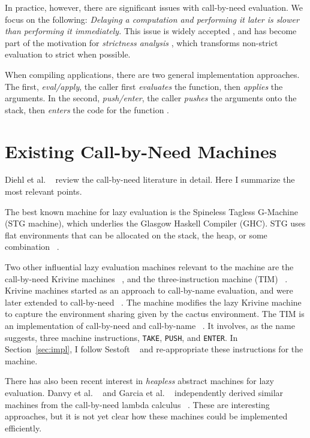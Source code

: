 In practice, however, there are significant issues with call-by-need evaluation.
We focus on the following: \emph{Delaying a computation and performing it later
is slower than performing it immediately.} This issue is widely accepted 
\cite{johnsson1984efficient,jonesstg}, and has become part of the motivation
for \emph{strictness analysis}
\cite{mycroft1982abstract,wadler1987projections}, which transforms non-strict
evaluation to strict when possible.

When compiling applications, there are two general implementation approaches.
The first, \emph{eval/apply}, the caller first \emph{evaluates} the function,
then \emph{applies} the arguments. In the second, \emph{push/enter}, the caller
\emph{pushes} the arguments onto the stack, then \emph{enters} the code for the
function \cite{marlow2006making}.  

\section{Existing Call-by-Need Machines}

Diehl et al. ~\cite{diehl2000abstract} review the call-by-need
literature in detail.  Here I summarize the most relevant points.

The best known machine for lazy evaluation is the Spineless Tagless
G-Machine (STG machine), which underlies the Glasgow Haskell Compiler (GHC). 
STG uses flat environments that can be allocated on the stack, the heap,
or some combination ~\cite{jonesstg}.  

Two other influential lazy evaluation machines relevant to the \ce 
machine are the call-by-need Krivine machines
~\cite{lkm,krivine2007call,sestoft}, and the three-instruction machine (TIM)
~\cite{TIM}.  Krivine machines started as an approach to call-by-name
evaluation, and were later extended to call-by-need
~\cite{krivine2007call,sestoft,danvy2013synthetic,lkm}.  The \ce machine
modifies the lazy Krivine machine to capture the environment sharing given by
the cactus environment. The TIM is an implementation of call-by-need and
call-by-name ~\cite{TIM}.  It involves, as the name suggests, three machine
instructions, \texttt{TAKE}, \texttt{PUSH}, and \texttt{ENTER}. In
Section~\ref{sec:impl}, I follow Sestoft ~\cite{sestoft} and
re-appropriate these instructions for the \ce machine.

There has also been recent interest in \emph{heapless} abstract
machines for lazy evaluation. Danvy et al. ~\cite{danvy2012inter} and
Garcia et al. ~\cite{garcia2009lazy} independently derived similar
machines from the call-by-need lambda calculus
~\cite{ariola1995call}. These are interesting approaches, but it is not yet
clear how these machines could be implemented efficiently.

